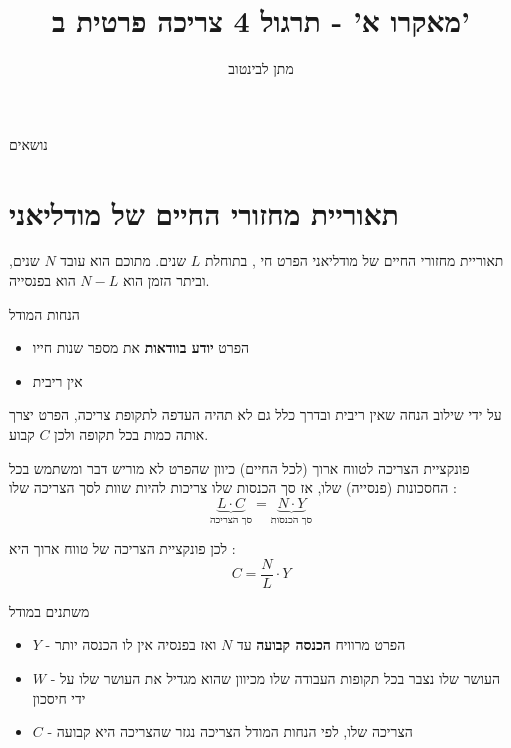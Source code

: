 \documentclass[usenames,dvipsnames]{beamer}
\title[]{{מאקרו א' - תרגול 4 צריכה פרטית ב'}}
\author{\texthebrew{ מתן לבינטוב}}
\institute[{{ אב"ג}}]{{ אוניברסיטת בן גוריון בנגב}}
\date{}
\begin{document}
\begin{RTL}
\begin{frame}
\titlepage
\end{frame}

\begin{frame}{נושאים}
    \tableofcontents
\end{frame}

\section{תאוריית מחזורי החיים של מודליאני}

\begin{frame}[allowframebreaks]{תאוריית מחזורי החיים של מודליאני}
הפרט חי , בתוחלת $L$ שנים. מתוכם הוא עובד $N$ שנים, וביתר הזמן הוא $N-L$ הוא בפנסייה.
\begin{block}{הנחות המודל}
    \begin{itemize}
        \item הפרט \textbf{יודע בוודאות} את מספר שנות חייו
        \item אין ריבית
    \end{itemize}
    על ידי שילוב הנחה שאין ריבית ובדרך כלל גם לא תהיה העדפה לתקופת צריכה, הפרט יצרך אותה כמות בכל תקופה ולכן $C$ קבוע.
\end{block}

\begin{block}{פונקציית הצריכה לטווח ארוך (לכל החיים)}
    כיוון שהפרט לא מוריש דבר ומשתמש בכל החסכונות (פנסייה) שלו, אז סך הכנסות שלו צריכות להיות שוות לסך הצריכה שלו :
    \begin{equation*}
       \underbrace{ L \cdot C }_{\text{סך הצריכה}}= \underbrace{N \cdot Y }_{\text{סך הכנסות}}
    \end{equation*}    

    לכן פונקציית הצריכה של טווח ארוך היא :
    $$
    C = \frac{N}{L}\cdot Y
    $$
\end{block}
\framebreak %
\begin{block}{משתנים במודל}
\begin{itemize}
    \item $Y$ - הפרט מרוויח \textbf{הכנסה קבועה} עד $N$ ואז בפנסיה אין לו הכנסה יותר
    \item $W$ - העושר שלו נצבר בכל תקופות העבודה שלו מכיוון שהוא מגדיל את העושר שלו על ידי חיסכון
    \item $C$ - הצריכה שלו, לפי הנחות המודל הצריכה נגזר שהצריכה היא קבועה
\end{itemize}
\end{block}
\begin{flushleft}
\end{flushleft}
\end{frame}
\end{RTL}
\end{document}
